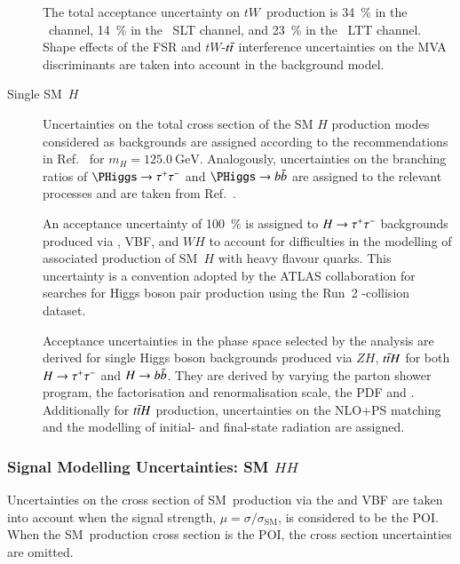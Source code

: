 \begin{description}
  The total acceptance uncertainty on $tW$~production is \SI{34}{\percent} in
  the \hadhad~channel, \SI{14}{\percent} in the \lephad~SLT channel, and
  \SI{23}{\percent} in the \lephad~LTT channel. Shape effects of the FSR and
  $tW$-$t\bar{t}$ interference uncertainties on the MVA discriminants are taken
  into account in the background model.

\item[Single SM~$H$] Uncertainties on the total cross section of the SM $H$
  production modes considered as backgrounds are assigned according to the
  recommendations in Ref.~\cite{deFlorian:2016spz} for
  $m_{H} = \SI{125.0}{\GeV}$. Analogously, uncertainties on the branching ratios
  of $\PHiggs \to \tautau$ and $\PHiggs \to \bbbar$ are assigned to the relevant
  processes and are taken from Ref.~\cite{deFlorian:2016spz}.

  An acceptance uncertainty of \SI{100}{\percent} is assigned to $H \to \tau^{+} \tau^{-}$
  backgrounds produced via \ggF, VBF, and $WH$ to account for difficulties in
  the modelling of associated production of SM~$H$ with heavy flavour
  quarks. This uncertainty is a convention adopted by the ATLAS collaboration
  for searches for Higgs boson pair production using the Run~2 \pp-collision
  dataset.

  Acceptance uncertainties in the phase space selected by the analysis are
  derived for single Higgs boson backgrounds produced via $ZH$, $t\bar{t} H$ for
  both $H \to \tau^{+} \tau^{-}$ and $H \to b\bar{b}$. They are derived by varying the
  parton shower program, the factorisation and renormalisation scale, the PDF
  and \alphas. Additionally for $t\bar{t} H$ production, uncertainties on the
  NLO+PS matching and the modelling of initial- and final-state radiation are
  assigned.
\end{description}





\subsubsection{Signal Modelling Uncertainties: SM $HH$}

Uncertainties on the cross section of SM~\HH production via the \ggF and VBF are
taken into account when the signal strength,
$\mu = \sigma / \sigma_{\text{SM}}$, is considered to be the POI. When the
SM~\HH production cross section is the POI, the cross section uncertainties are
omitted.

